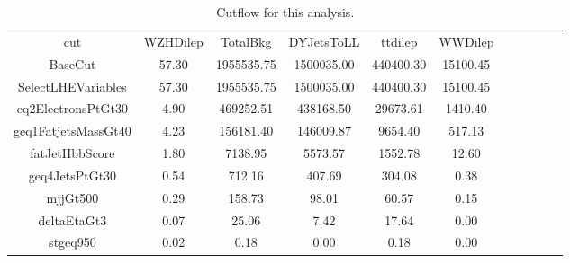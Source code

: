 \begin{table}[htp]
\begin{center}
\begin{tabular}{ccccccccccc}
\hline
\hline
        cut         & WZHDilep &  TotalBkg  & DYJetsToLL &  ttdilep  & WWDilep  \\
      BaseCut       &  57.30   & 1955535.75 & 1500035.00 & 440400.30 & 15100.45 \\
SelectLHEVariables  &  57.30   & 1955535.75 & 1500035.00 & 440400.30 & 15100.45 \\
eq2ElectronsPtGt30  &   4.90   & 469252.51  & 438168.50  & 29673.61  & 1410.40  \\
geq1FatjetsMassGt40 &   4.23   & 156181.40  & 146009.87  &  9654.40  &  517.13  \\
  fatJetHbbScore    &   1.80   &  7138.95   &  5573.57   &  1552.78  &  12.60   \\
  geq4JetsPtGt30    &   0.54   &   712.16   &   407.69   &  304.08   &   0.38   \\
     mjjGt500       &   0.29   &   158.73   &   98.01    &   60.57   &   0.15   \\
    deltaEtaGt3     &   0.07   &   25.06    &    7.42    &   17.64   &   0.00   \\
     stgeq950       &   0.02   &    0.18    &    0.00    &   0.18    &   0.00   \\
\hline
\hline
\end{tabular}
\end{center}
\caption{Cutflow for this analysis.}
\label{tab:cutflow}
\end{table}
